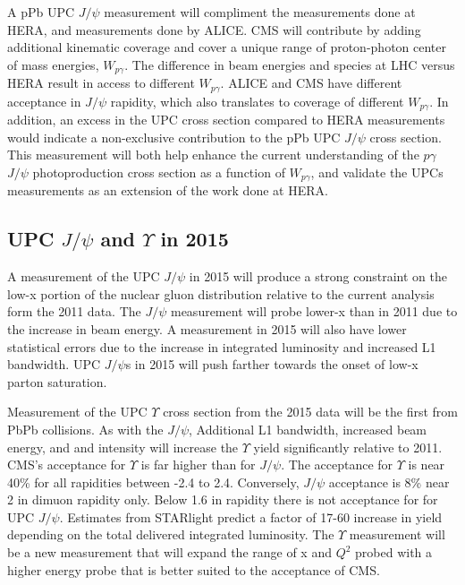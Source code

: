       A pPb UPC $J/\psi$ measurement will compliment the measurements done at 
        HERA, and measurements done by ALICE.
      CMS will contribute by adding additional kinematic coverage and cover a 
        unique range of proton-photon center of mass energies, $W_{p\gamma}$. 
      The difference in beam energies and species at LHC versus HERA result in
        access to different $W_{p\gamma}$. 
      ALICE and CMS have different acceptance in $J/\psi$ rapidity, which also 
        translates to coverage of different $W_{p\gamma}$.
      In addition, an excess in the UPC cross section compared to HERA 
        measurements would indicate a non-exclusive contribution to the pPb UPC 
        $J/\psi$ cross section. 
      This measurement will both help enhance the current understanding of 
        the $p\gamma$ $J/\psi$ photoproduction cross section as a function of 
        $W_{p\gamma}$, and validate the UPCs measurements as an extension of 
        the work done at HERA.

    \subsection{UPC $J/\psi$ and $\Upsilon$ in 2015}
      A measurement of the UPC $J/\psi$ in 2015 will produce a strong constraint
        on the low-x portion of the nuclear gluon distribution relative to 
        the current analysis form the 2011 data. 
      The $J/\psi$ measurement will probe lower-x than in 2011 due to the 
        increase in beam energy. 
      A measurement in 2015 will also have lower statistical errors due to the 
        increase in integrated luminosity and increased L1 bandwidth.
      UPC $J/\psi$s in 2015 will push farther towards the onset of low-x parton 
        saturation.

      Measurement of the UPC $\Upsilon$ cross section from the 2015 data will 
        be the first from PbPb collisions. 
      As with the $J/\psi$, Additional L1 bandwidth, increased beam energy, and
        and intensity will increase the $\Upsilon$ yield significantly relative
        to 2011. 
      CMS's acceptance for $\Upsilon$ is far higher than for $J/\psi$.
      The acceptance for $\Upsilon$ is near 40\% for all rapidities between 
        -2.4 to 2.4.
      Conversely, $J/\psi$ acceptance is 8\% near 2 in dimuon rapidity only. 
      Below 1.6 in rapidity there is not acceptance for for UPC $J/\psi$.
      Estimates from STARlight predict a factor of 17-60 increase in yield
        depending on the total delivered integrated luminosity. 
      The $\Upsilon$ measurement will be a new measurement that will expand the 
        range of x and $Q^{2}$ probed with a higher energy probe that is better
        suited to the acceptance of CMS.

